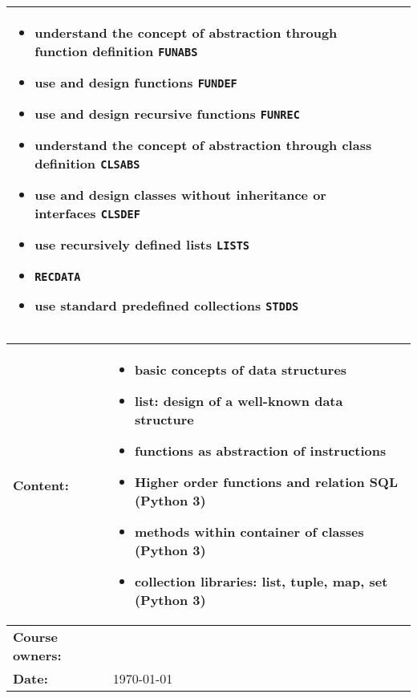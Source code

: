 \begin{tabularx}{\textwidth}{|>{\columncolor{lichtGrijs}} p{}|X|}
\begin{itemize}
			   \item \textbf{understand} the concept of abstraction through function definition \texttt{FUNABS}
               \item \textbf{use} and \textbf{design} functions \texttt{FUNDEF}
               \item \textbf{use} and \textbf{design} recursive functions \texttt{FUNREC}
               \item \textbf{understand} the concept of abstraction through class definition \texttt{CLSABS}
               \item \textbf{use} and \textbf{design} classes without inheritance or interfaces \texttt{CLSDEF}
               \item \textbf{use} recursively defined lists \texttt{LISTS}
               \item \texttt{RECDATA}
               \item \textbf{use} standard predefined collections \texttt{STDDS}
			\end{itemize} \\
		
	\hline
\end{tabularx}
\newpage

\begin{tabularx}{\textwidth}{|>{\columncolor{lichtGrijs}} p{}|X|}
	\hline
	\textbf{Content:}&
	\begin{itemize}
		\item basic concepts of data structures
		\item list: design of a well-known data structure
		\item functions as abstraction of instructions 
		\item Higher order functions and relation SQL (Python 3)
		\item methods within container of classes (Python 3)
		\item collection libraries: list, tuple, map, set (Python 3)
	\end{itemize} \\
	\hline
	\textbf{Course owners:} & \author\\
	\hline
	\textbf{Date:} & \today \\
	\hline
\end{tabularx}
\newpage
